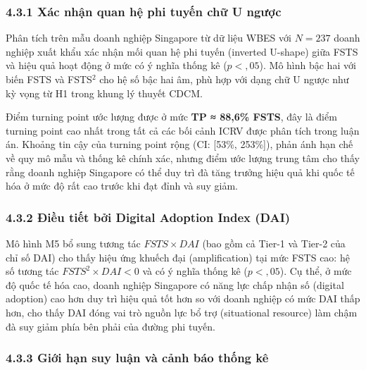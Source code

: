 \documentclass[12pt,a4paper]{article}
\begin{document}
\hypertarget{431-xuxe1c-nhux1eadn-quan-hux1ec7-phi-tuyux1ebfn-chux1eef-u-ngux1b0ux1ee3c}{%
\subsubsection{4.3.1 Xác nhận quan hệ phi tuyến chữ U
ngược}\label{431-xuxe1c-nhux1eadn-quan-hux1ec7-phi-tuyux1ebfn-chux1eef-u-ngux1b0ux1ee3c}}

Phân tích trên mẫu doanh nghiệp Singapore từ dữ liệu WBES với
\(N = 237\) doanh nghiệp xuất khẩu xác nhận mối quan hệ phi tuyến
(inverted U-shape) giữa FSTS và hiệu quả hoạt động ở mức có ý nghĩa
thống kê (\(p < {,}05\)). Mô hình bậc hai với biến FSTS và FSTS\(^2\)
cho hệ số bậc hai âm, phù hợp với dạng chữ U ngược như kỳ vọng từ H1
trong khung lý thuyết CDCM.

Điểm turning point ước lượng được ở mức \textbf{TP ≈ 88,6\% FSTS}, đây
là điểm turning point cao nhất trong tất cả các bối cảnh ICRV được phân
tích trong luận án. Khoảng tin cậy của turning point rộng (CI: {[}53\%,
253\%{]}), phản ánh hạn chế về quy mô mẫu và thống kê chính xác, nhưng
điểm ước lượng trung tâm cho thấy rằng doanh nghiệp Singapore có thể duy
trì đà tăng trưởng hiệu quả khi quốc tế hóa ở mức độ rất cao trước khi
đạt đỉnh và suy giảm.

\hypertarget{432-ux111iux1ec1u-tiux1ebft-bux1edfi-digital-adoption-index-dai}{%
\subsubsection{4.3.2 Điều tiết bởi Digital Adoption Index
(DAI)}\label{432-ux111iux1ec1u-tiux1ebft-bux1edfi-digital-adoption-index-dai}}

Mô hình M5 bổ sung tương tác \(FSTS \times DAI\) (bao gồm cả Tier-1 và
Tier-2 của chỉ số DAI) cho thấy hiệu ứng khuếch đại (amplification) tại
mức FSTS cao: hệ số tương tác \(FSTS^2 \times DAI < 0\) và có ý nghĩa
thống kê (\(p < {,}05\)). Cụ thể, ở mức độ quốc tế hóa cao, doanh nghiệp
Singapore có năng lực chấp nhận số (digital adoption) cao hơn duy trì
hiệu quả tốt hơn so với doanh nghiệp có mức DAI thấp hơn, cho thấy DAI
đóng vai trò nguồn lực bổ trợ (situational resource) làm chậm đà suy
giảm phía bên phải của đường phi tuyến.

\hypertarget{433-giux1edbi-hux1ea1n-suy-luux1eadn-vuxe0-cux1ea3nh-buxe1o-thux1ed1ng-kuxea}{%
\subsubsection{4.3.3 Giới hạn suy luận và cảnh báo thống
kê}\label{433-giux1edbi-hux1ea1n-suy-luux1eadn-vuxe0-cux1ea3nh-buxe1o-thux1ed1ng-kuxea}}
\end{document}
